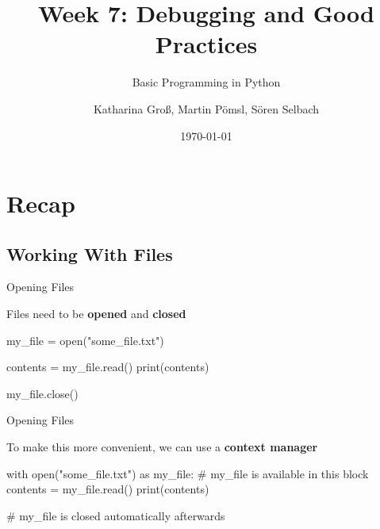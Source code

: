 



\title[Good Practices]{Week 7: Debugging and Good Practices}
\subtitle{Basic Programming in Python}

\author[kgross, mpoemsl, sselbach]{Katharina Groß, Martin Pömsl, Sören Selbach}

\date{\today}

\begin{frame}[plain]
     \titlepage
\end{frame}

\begin{frame}
    \tableofcontents
\end{frame}

\section{Recap}

\subsection{Working With Files}

\begin{frame}[fragile]{Opening Files}

    \begin{block}{}
        Files need to be \textbf{opened} and \textbf{closed}
    \end{block}

    \vspace{1em}

    \begin{pythoncode}
    my_file = open("some_file.txt")

    contents = my_file.read()
    print(contents)

    my_file.close()
    \end{pythoncode}

\end{frame}

\begin{frame}[fragile]{Opening Files}

    \begin{block}{}
        To make this more convenient, we can use a \textbf{context manager}
    \end{block}

    \vspace{1em}

    \begin{pythoncode}
    with open("some_file.txt") as my_file:
        # my_file is available in this block
        contents = my_file.read()
        print(contents)

    # my_file is closed automatically afterwards
    \end{pythoncode}


\end{frame}


